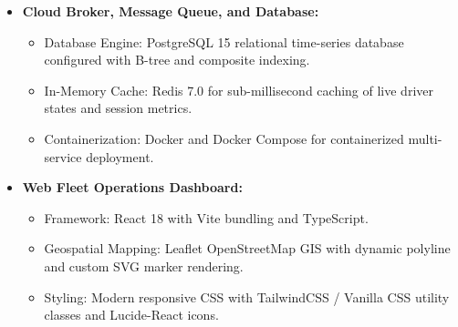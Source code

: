 \begin{itemize}
    \item \textbf{Cloud Broker, Message Queue, and Database:}
    \begin{itemize}
        \item Database Engine: PostgreSQL 15 relational time-series database configured with B-tree and composite indexing.
        \item In-Memory Cache: Redis 7.0 for sub-millisecond caching of live driver states and session metrics.
        \item Containerization: Docker and Docker Compose for containerized multi-service deployment.
    \end{itemize}
    
    \item \textbf{Web Fleet Operations Dashboard:}
    \begin{itemize}
        \item Framework: React 18 with Vite bundling and TypeScript.
        \item Geospatial Mapping: Leaflet OpenStreetMap GIS with dynamic polyline and custom SVG marker rendering.
        \item Styling: Modern responsive CSS with TailwindCSS / Vanilla CSS utility classes and Lucide-React icons.
    \end{itemize}
\end{itemize}
